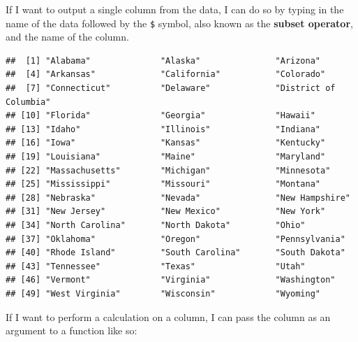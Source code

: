 \documentclass[
]{book}
\newenvironment{Shaded}{\begin{snugshade}}{\end{snugshade}}
\newcommand{\AttributeTok}[1]{\textcolor[rgb]{0.13,0.29,0.53}{#1}}
\newcommand{\CommentTok}[1]{\textcolor[rgb]{0.56,0.35,0.01}{\textit{#1}}}
\newcommand{\ConstantTok}[1]{\textcolor[rgb]{0.56,0.35,0.01}{#1}}
\newcommand{\FunctionTok}[1]{\textcolor[rgb]{0.13,0.29,0.53}{\textbf{#1}}}
\newcommand{\NormalTok}[1]{#1}
\newcommand{\SpecialCharTok}[1]{\textcolor[rgb]{0.81,0.36,0.00}{\textbf{#1}}}
\begin{document}
If I want to output a single column from the data, I can do so by typing in the name of the data followed by the \texttt{\$} symbol, also known as the \textbf{subset operator}, and the name of the column.

\begin{Shaded}
\end{Shaded}

\begin{verbatim}
##  [1] "Alabama"              "Alaska"               "Arizona"             
##  [4] "Arkansas"             "California"           "Colorado"            
##  [7] "Connecticut"          "Delaware"             "District of Columbia"
## [10] "Florida"              "Georgia"              "Hawaii"              
## [13] "Idaho"                "Illinois"             "Indiana"             
## [16] "Iowa"                 "Kansas"               "Kentucky"            
## [19] "Louisiana"            "Maine"                "Maryland"            
## [22] "Massachusetts"        "Michigan"             "Minnesota"           
## [25] "Mississippi"          "Missouri"             "Montana"             
## [28] "Nebraska"             "Nevada"               "New Hampshire"       
## [31] "New Jersey"           "New Mexico"           "New York"            
## [34] "North Carolina"       "North Dakota"         "Ohio"                
## [37] "Oklahoma"             "Oregon"               "Pennsylvania"        
## [40] "Rhode Island"         "South Carolina"       "South Dakota"        
## [43] "Tennessee"            "Texas"                "Utah"                
## [46] "Vermont"              "Virginia"             "Washington"          
## [49] "West Virginia"        "Wisconsin"            "Wyoming"
\end{verbatim}

If I want to perform a calculation on a column, I can pass the column as an argument to a function like so:

\begin{Shaded}
\end{Shaded}
\end{document}
